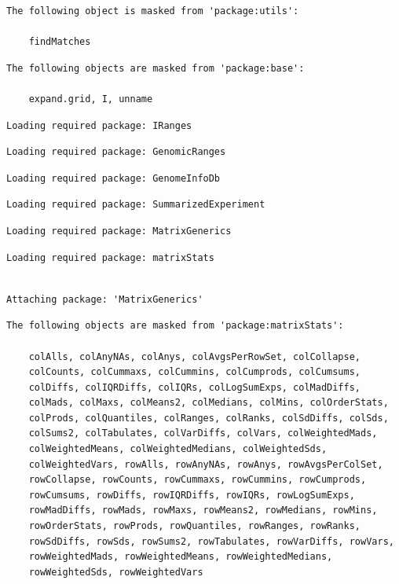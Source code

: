 \documentclass[
  letterpaper,
  DIV=11,
  numbers=noendperiod]{scrartcl}
\begin{document}
\begin{verbatim}
The following object is masked from 'package:utils':

    findMatches
\end{verbatim}

\begin{verbatim}
The following objects are masked from 'package:base':

    expand.grid, I, unname
\end{verbatim}

\begin{verbatim}
Loading required package: IRanges
\end{verbatim}

\begin{verbatim}
Loading required package: GenomicRanges
\end{verbatim}

\begin{verbatim}
Loading required package: GenomeInfoDb
\end{verbatim}

\begin{verbatim}
Loading required package: SummarizedExperiment
\end{verbatim}

\begin{verbatim}
Loading required package: MatrixGenerics
\end{verbatim}

\begin{verbatim}
Loading required package: matrixStats
\end{verbatim}

\begin{verbatim}

Attaching package: 'MatrixGenerics'
\end{verbatim}

\begin{verbatim}
The following objects are masked from 'package:matrixStats':

    colAlls, colAnyNAs, colAnys, colAvgsPerRowSet, colCollapse,
    colCounts, colCummaxs, colCummins, colCumprods, colCumsums,
    colDiffs, colIQRDiffs, colIQRs, colLogSumExps, colMadDiffs,
    colMads, colMaxs, colMeans2, colMedians, colMins, colOrderStats,
    colProds, colQuantiles, colRanges, colRanks, colSdDiffs, colSds,
    colSums2, colTabulates, colVarDiffs, colVars, colWeightedMads,
    colWeightedMeans, colWeightedMedians, colWeightedSds,
    colWeightedVars, rowAlls, rowAnyNAs, rowAnys, rowAvgsPerColSet,
    rowCollapse, rowCounts, rowCummaxs, rowCummins, rowCumprods,
    rowCumsums, rowDiffs, rowIQRDiffs, rowIQRs, rowLogSumExps,
    rowMadDiffs, rowMads, rowMaxs, rowMeans2, rowMedians, rowMins,
    rowOrderStats, rowProds, rowQuantiles, rowRanges, rowRanks,
    rowSdDiffs, rowSds, rowSums2, rowTabulates, rowVarDiffs, rowVars,
    rowWeightedMads, rowWeightedMeans, rowWeightedMedians,
    rowWeightedSds, rowWeightedVars
\end{verbatim}
\end{document}
